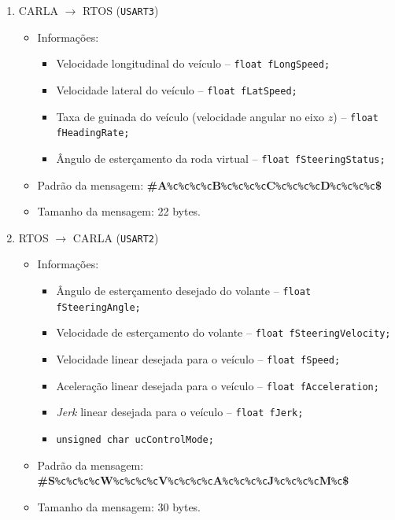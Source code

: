 \begin{enumerate}
	\item CARLA $\longrightarrow$ RTOS (\texttt{USART3})
	\begin{itemize}
		\item Informações:
		\begin{itemize}
			\item Velocidade longitudinal do veículo -- \texttt{float fLongSpeed;}
			\item Velocidade lateral do veículo -- \texttt{float fLatSpeed;}
			\item Taxa de guinada do veículo (velocidade angular no eixo $z$) -- \texttt{float fHeadingRate;}
			\item Ângulo de esterçamento da roda virtual -- \texttt{float fSteeringStatus;}		
		\end{itemize}
		\item Padrão da mensagem: \textbf{\#A}\texttt{\%c\%c\%c\%c}\textbf{B}\texttt{\%c\%c\%c\%c}\textbf{C}\texttt{\%c\%c\%c\%c}\textbf{D}\texttt{\%c\%c\%c\%c}\textbf{\$}
		\item Tamanho da mensagem: 22 bytes.
		
	\end{itemize}
	\item RTOS $\longrightarrow$ CARLA (\texttt{USART2})
	\begin{itemize}
		\item Informações:
		\begin{itemize}
			\item Ângulo de esterçamento desejado do volante -- \texttt{float fSteeringAngle;}
			\item Velocidade de esterçamento do volante -- \texttt{float fSteeringVelocity;}
			\item Velocidade linear desejada para o veículo -- \texttt{float fSpeed;}
			\item Aceleração linear desejada para o veículo -- \texttt{float fAcceleration;}
			\item \textit{Jerk} linear desejada para o veículo -- \texttt{float fJerk;}	
			\item \texttt{unsigned char ucControlMode;}		
		\end{itemize}
		\item Padrão da mensagem: \textbf{\#S}\texttt{\%c\%c\%c\%c}\textbf{W}\texttt{\%c\%c\%c\%c}\textbf{V}\texttt{\%c\%c\%c\%c}\textbf{A}\texttt{\%c\%c\%c\%c}\textbf{J}\texttt{\%c\%c\%c\%c}\textbf{M}\texttt{\%c}\textbf{\$}
		\item Tamanho da mensagem: 30 bytes.
		
	\end{itemize}
\end{enumerate}


